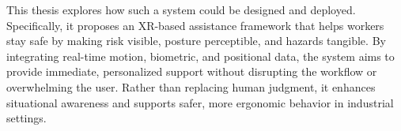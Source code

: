 This thesis explores how such a system could be designed and deployed. Specifically, it proposes an XR-based assistance framework that helps workers stay safe by making risk visible, posture perceptible, and hazards tangible. By integrating real-time motion, biometric, and positional data, the system aims to provide immediate, personalized support without disrupting the workflow or overwhelming the user. Rather than replacing human judgment, it enhances situational awareness and supports safer, more ergonomic behavior in industrial settings.
